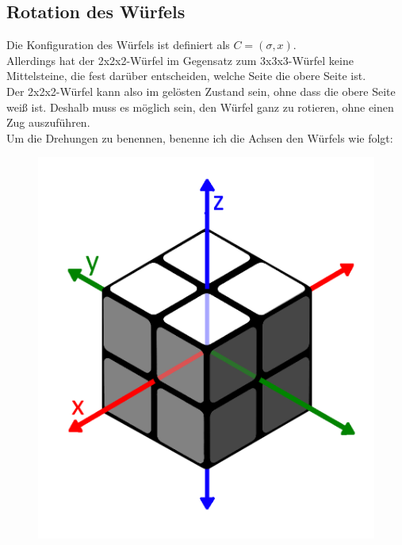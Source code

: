 \documentclass[12pt,a4paper, usenames, dvipsnames]{scrartcl}
\begin{document}








\subsection*{Rotation des Würfels}

Die Konfiguration des Würfels ist definiert als $C=(\sigma, x)$. \\
Allerdings hat der 2x2x2-Würfel im Gegensatz zum 3x3x3-Würfel keine Mittelsteine, die fest darüber entscheiden, welche Seite die obere Seite ist. \\
Der 2x2x2-Würfel kann also im gelösten Zustand sein, ohne dass die obere Seite weiß ist. Deshalb muss es möglich sein, den Würfel ganz zu rotieren, ohne einen Zug auszuführen. \\
Um die Drehungen zu benennen, benenne ich die Achsen den Würfels wie folgt:
\begin{figure}[H]
\centering
\includegraphics[scale=0.13]{Pfeile.png}
\end{figure} 
\end{document}
